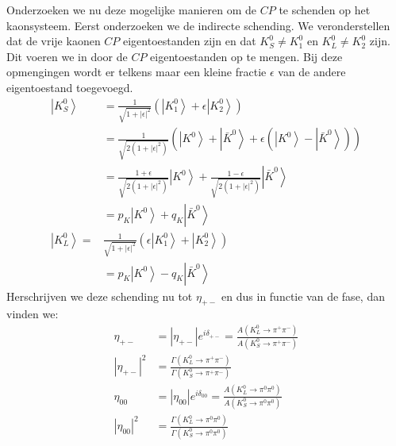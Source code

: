 \documentclass[../main.tex]{subfiles}
\begin{document}
Onderzoeken we nu deze mogelijke manieren om de $CP$ te schenden op het kaonsysteem. Eerst onderzoeken we de indirecte schending. We veronderstellen dat de vrije kaonen $CP$ eigentoestanden zijn en dat $K_S^0\neq K_1^0$ en $K_L^0\neq K_2^0$ zijn. Dit voeren we in door de $CP$ eigentoestanden op te mengen. Bij deze opmengingen wordt er telkens maar een kleine fractie $\epsilon$ van de andere eigentoestand toegevoegd.
\begin{equation}
    \begin{aligned}
        \label{eq:kaon_indirecte_cp_violation_1}
        \left| K_{S}^{0}\right>&=\frac{1}{\sqrt{1+|\epsilon|^{2}}}\left(\left|K_{1}^{0}\right>+\epsilon\left| K_{2}^{0} \right>\right) \\
                               &=\frac{1}{\sqrt{2\left(1+|\epsilon|^{2}\right)}}\left(\left|K^{0}\right>+\left| \bar{K}^{0}\right>+\epsilon\left(\left|K^{0}\right>-\left| \bar{K}^{0}\right>\right)\right) \\
                               &=\frac{1+\epsilon}{\sqrt{2\left(1+|\epsilon|^{2}\right)}}\left|K^{0}\right>+\frac{1-\epsilon}{\sqrt{2\left(1+|\epsilon|^{2}\right)}}\left| \bar{K}^{0}\right>\\
                               &=p_{K}\left|K^{0}\right>+q_{K}\left| \bar{K}^{0}\right>\\
        \left| K_{L}^{0}\right>=& \frac{1}{\sqrt{1+|\epsilon|^{2}}}\left(\epsilon\left|K_{1}^{0}\right>+\left| K_{2}^{0}\right>\right) \\
                                &=p_{K}\left|K^{0}\right>-q_{K}\left| \bar{K}^{0}\right>
    \end{aligned}
\end{equation}
Herschrijven we deze schending nu tot $\eta_{+-}$ en dus in functie van de fase, dan vinden we:
\begin{equation}
    \begin{aligned}
        \label{eq:kaon_indirecte_cp_violation_2}
        \eta_{+-} &=\left|\eta_{+-}\right| e^{i \delta_{+-}}=\frac{A\left(K_{L}^{0} \rightarrow \pi^{+} \pi^{-}\right)}{A\left(K_{S}^{0} \rightarrow \pi^{+} \pi^{-}\right)} \\
        \left|\eta_{+-}\right|^{2} &=\frac{\Gamma\left(K_{L}^{0} \rightarrow \pi^{+} \pi^{-}\right)}{\Gamma\left(K_{S}^{0} \rightarrow \pi^{+} \pi^{-}\right)} \\
        \eta_{00} &=\left|\eta_{00}\right| e^{i \delta_{00}}=\frac{A\left(K_{L}^{0} \rightarrow \pi^{0} \pi^{0}\right)}{A\left(K_{S}^{0} \rightarrow \pi^{0} \pi^{0}\right)} \\
        \left|\eta_{00}\right|^{2} &=\frac{\Gamma\left(K_{L}^{0} \rightarrow \pi^{0} \pi^{0}\right)}{\Gamma\left(K_{S}^{0} \rightarrow \pi^{0} \pi^{0}\right)}
    \end{aligned}
\end{equation}
\end{document}
